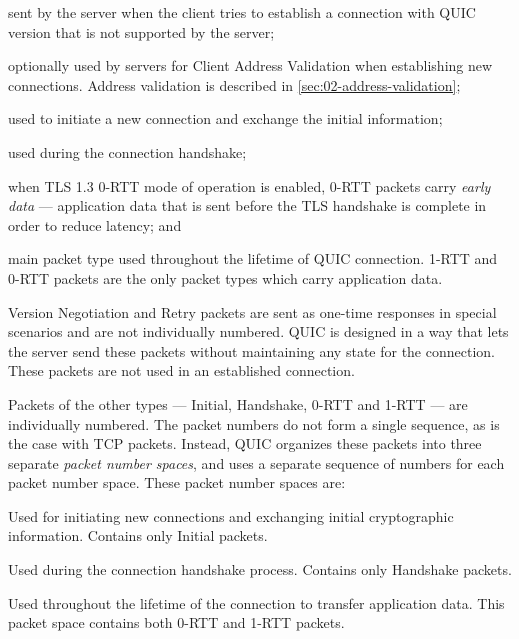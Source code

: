 \begin{enumerate}

   sent by the server when the client tries to establish a connection
  with QUIC version that is not supported by the server;

   optionally used by servers for Client Address Validation  when establishing new connections. Address validation is described in \autoref{sec:02-address-validation};

   used to initiate a new connection and exchange the initial information;

   used during the connection handshake;

   when TLS 1.3 0-RTT mode of operation is enabled, 0-RTT packets carry \textit{early
  data} --- application data that is sent before the TLS handshake is complete in order to reduce
  latency; and

   main packet type used throughout the lifetime of QUIC connection. 1-RTT and 0-RTT
  packets are the only packet types which carry application data.

\end{enumerate}

Version Negotiation and Retry packets are sent as one-time responses in special scenarios and are
not individually numbered. QUIC is designed in a way that lets the server send these packets without
maintaining any state for the connection. These packets are not used in an established connection.

Packets of the other types --- Initial, Handshake, 0-RTT and 1-RTT --- are individually numbered. The
packet numbers do not form a single sequence, as is the case with TCP packets. Instead, QUIC
organizes these packets into three separate \textit{packet number spaces}, and uses a separate
sequence of numbers for each packet number space. These packet number spaces are:

\begin{enumerate}

   Used for initiating new connections and exchanging initial cryptographic
  information. Contains only Initial packets.

   Used during the connection handshake process. Contains only Handshake packets.

   Used throughout the lifetime of the connection to transfer application data.
  This packet space contains both 0-RTT and 1-RTT packets.

\end{enumerate}

